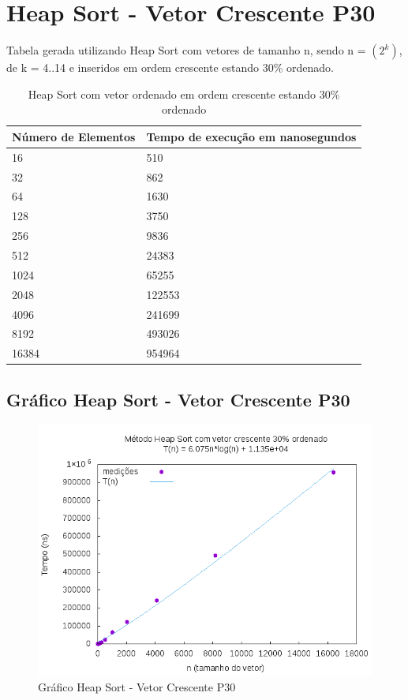 \documentclass[12pt,a4paper,twoside]{report}
\begin{document}
\section{Heap Sort - Vetor Crescente P30}
Tabela gerada utilizando Heap Sort com vetores de tamanho n, sendo n = $(2^k)$, de k = 4..14 e inseridos em ordem crescente estando 30\% ordenado.
\begin{table}[H]
\centering
\caption{Heap Sort com vetor ordenado em ordem crescente estando 30\% ordenado}
\label{my-label}
\begin{tabular}{|l|l|}
\hline
\multicolumn{1}{|c|}{\textbf{Número de Elementos}} & \multicolumn{1}{c|}{\textbf{Tempo de execução em nanosegundos}} \\ \hline
16 & 510 \\ \hline
32 & 862 \\ \hline
64 & 1630 \\ \hline
128 & 3750 \\ \hline
256 & 9836 \\ \hline
512 & 24383 \\ \hline
1024 & 65255 \\ \hline
2048 & 122553 \\ \hline
4096 & 241699 \\ \hline
8192 & 493026 \\ \hline
16384 & 954964 \\ \hline
\end{tabular}
\end{table}

\subsection{Gráfico Heap Sort - Vetor Crescente P30}
\begin{figure}[H]
    \centering
    \includegraphics[width=0.7\linewidth]{graficos/HeapSort/vIntCrescenteP30/vIntCrescenteP30.png}
  \caption{Gráfico Heap Sort - Vetor Crescente P30}
\end{figure}
\end{document}
